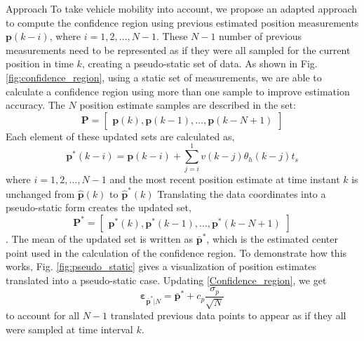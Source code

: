 \begin{section}{Approach}
To take vehicle mobility into account, we propose an adapted approach to compute the confidence region using previous estimated position measurements $\bm{p}(k-i)$, where $i=1,2,\dots,N-1$. These $N-1$ number of previous measurements need to be represented as if they were all sampled for the current position in time $k$, creating a pseudo-static set of data. As shown in Fig. \ref{fig:confidence_region}, using a static set of measurements, we are able to calculate a confidence region using more than one sample to improve estimation accuracy. The $N$ position estimate samples are described in the set:
\begin{equation}
    \bm{P}=\begin{bmatrix} \bm{p}(k) ,\bm{p}(k-1),\dots,\bm{p}(k-N+1) \end{bmatrix} 
\end{equation}
Each element of these updated sets are calculated as,
	\begin{equation}
	\bm{p}^*(k-i) = \bm{p}(k-i)+\sum_{j=i}^1 v(k-j)\theta_h(k-j)t_s 
	\end{equation}
where $i=1,2,\dots,N-1$ and the most recent position estimate at time instant $k$ is unchanged from $\hat{\bm{p}}(k)$ to $\hat{\bm{p}}^*(k)$
Translating the data coordinates into a pseudo-static form creates the updated set,
\begin{equation}
    \bm{P}^*=\begin{bmatrix} \bm{p}^*(k) ,\bm{p}^*(k-1),\dots,\bm{p}^*(k-N+1) \end{bmatrix} \nonumber
\end{equation}
. The mean of the updated set is written as $\bar{\bm{p}}^*$, which is the estimated center point used in the calculation of the confidence region. To demonstrate how this works, Fig. \ref{fig:pseudo_static} gives a visualization of position estimates translated into a pseudo-static case. Updating \eqref{Confidence_region}, we get
    \begin{equation}
    \label{Confidence_region_updated}
		\bm{\varepsilon}_{\bar{\bm{p}}^*|N} = \bar{\bm{p}}^* + c_p\frac{\sigma_p}{\sqrt{N}}
	\end{equation}
 to account for all $N-1$ translated previous data points to appear as if they all were sampled at time interval $k$.




\end{section}
